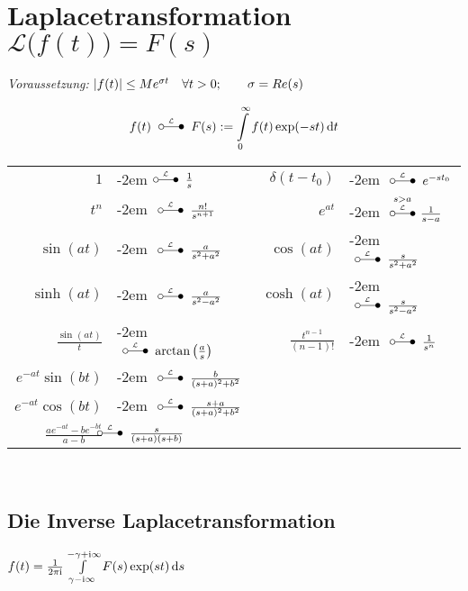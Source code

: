\documentclass[german,color,5pt]{latex4ei/latex4ei_fs}
\begin{document}
\section{Laplacetransformation \quad $\mathcal L\bigl(f(t)\bigr) = F(s)$}
\begin{sectionbox}
	\emph{Voraussetzung:} $\left\vert f(t)\right\vert \leq M e^{\sigma t} \quad \forall t > 0; \qquad \sigma = Re(s)$
	\begin{emphbox}\vspace{-5pt}
		\[f(t) \LT F(s) := \int\limits_0^\infty f(t) \exp(-st) \diff t\]
	\end{emphbox}
	\begin{tabular}{rlrl}
		$1$ & \kern-2em$\LT \frac{1}{s}$ & $\delta(t-t_0)$ & \kern-2em $\LT e^{-s t_0}$\\[0.2em]
		$t^n$ & \kern-2em $\LT \frac{n!}{s^{n+1}}$ & $e^{at}$  & \kern-2em $\overset{s > a}{ \LT } \frac{1}{s-a}$\\[0.5em] 
		$\sin(a t)$ & \kern-2em $\LT \frac{a}{s^2 + a^2}$ & $\cos(a t)$ & \kern-2em $\LT \frac{s}{s^2 + a^2}$\\[0.5em]
		$\sinh(a t)$ & \kern-2em $\LT \frac{a}{s^2 - a^2}$ & $\cosh(a t)$ & \kern-2em $\LT \frac{s}{s^2 - a^2}$\\[0.5em]
		$\frac{\sin(at)}{t}$ & \kern-2em $\LT\arctan\left(\frac{a}{s}\right)$	& $\frac{t^{n-1}}{(n-1)!}$   & \kern-2em $\LT \frac{1}{s^n}$ \\[0.5em]
		$e^{-at} \sin(b t)$ & \kern-2em $\LT \frac{b}{(s+a)^2+b^2}$ \\
		$e^{-at} \cos(b t)$ & \kern-2em $\LT \frac{s+a}{(s+a)^2+b^2}$\\
		$\frac{ae^{-at}-be^{-bt}}{a-b}$ & $\kern-2em \LT \frac{s}{(s+a)(s+b)}$
	\end{tabular}\\
	\subsection{Die Inverse Laplacetransformation}
	$f(t) = \frac{1}{2\pi \i} \int\limits_{\gamma - \i \infty}^{-\gamma + \i \infty} F(s) \exp(st) \diff s$
\end{sectionbox}
\end{document}
